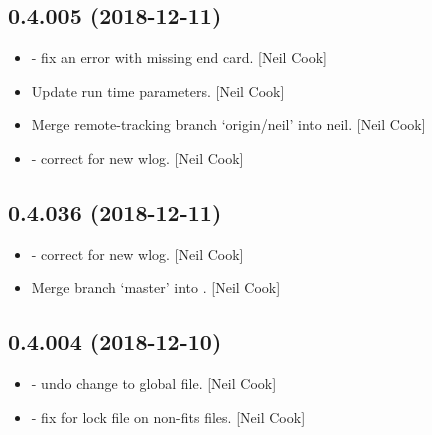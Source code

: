 \documentclass[a4paper,10pt,english]{report}
\begin{document}
\subsection{0.4.005 (2018-12-11)}
\label{\detokenize{misc/changelog:id239}}\begin{itemize}
\item {} 
 - fix an error with missing end card. {[}Neil Cook{]}

\item {} 
Update  run time parameters. {[}Neil Cook{]}

\item {} 
Merge remote-tracking branch ‘origin/neil’ into neil. {[}Neil Cook{]}

\item {} 
 - correct  for new wlog. {[}Neil
Cook{]}

\end{itemize}


\subsection{0.4.036 (2018-12-11)}
\label{\detokenize{misc/changelog:id240}}\begin{itemize}
\item {} 
 - correct  for new wlog. {[}Neil
Cook{]}

\item {} 
Merge branch ‘master’ into . {[}Neil Cook{]}

\end{itemize}


\subsection{0.4.004 (2018-12-10)}
\label{\detokenize{misc/changelog:id241}}\begin{itemize}
\item {} 
 - undo change to global file. {[}Neil Cook{]}

\item {} 
 - fix for lock file on non-fits files. {[}Neil Cook{]}

\end{itemize}
\end{document}
